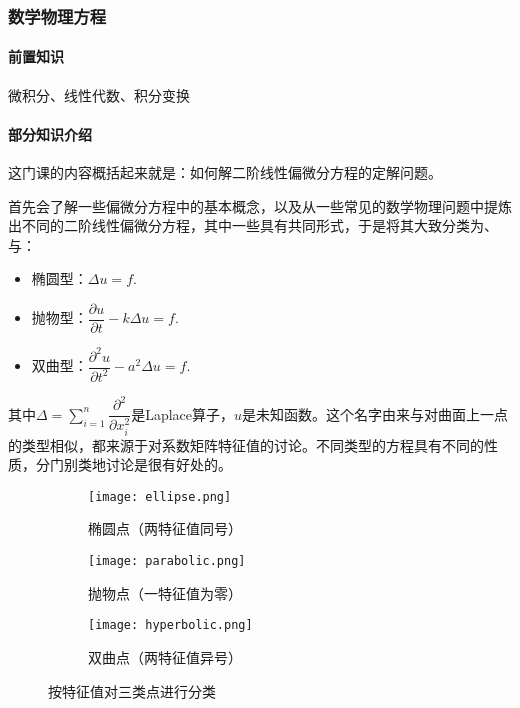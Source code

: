 \subsubsection{数学物理方程}

\paragraph{前置知识}微积分、线性代数、积分变换

\paragraph{部分知识介绍}

这门课的内容概括起来就是：如何解二阶线性偏微分方程的定解问题。

首先会了解一些偏微分方程中的基本概念，以及从一些常见的数学物理问题中提炼出不同的二阶线性偏微分方程，其中一些具有共同形式，于是将其大致分类为、与：

\begin{itemize}
    \item 椭圆型：$\Delta u = f$.
    \item 抛物型：$\dfrac{\partial u}{\partial t}-k\Delta u = f$.
    \item  双曲型：$\dfrac{\partial^2 u}{\partial t^2}-a^2\Delta u = f$.
\end{itemize}

其中$\Delta=\displaystyle\sum_{i=1}^{n}\dfrac{\partial^2}{\partial x_i^2}$是Laplace算子，$u$是未知函数。这个名字由来与对曲面上一点的类型相似，都来源于对系数矩阵特征值的讨论。不同类型的方程具有不同的性质，分门别类地讨论是很有好处的。

\begin{figure}[ht]
    \centering
    \begin{subfigure}[t]{0.3\textwidth}\centering
        \texttt{[image: ellipse.png]}
        \caption{椭圆点（两特征值同号）}
    \end{subfigure}
    \begin{subfigure}[t]{0.3\textwidth}\centering
        \texttt{[image: parabolic.png]}
        \caption{抛物点（一特征值为零）}
    \end{subfigure}
    \begin{subfigure}[t]{0.3\textwidth}\centering
        \texttt{[image: hyperbolic.png]}
        \caption{双曲点（两特征值异号）}
    \end{subfigure}
    \caption{按特征值对三类点进行分类}
\end{figure}

